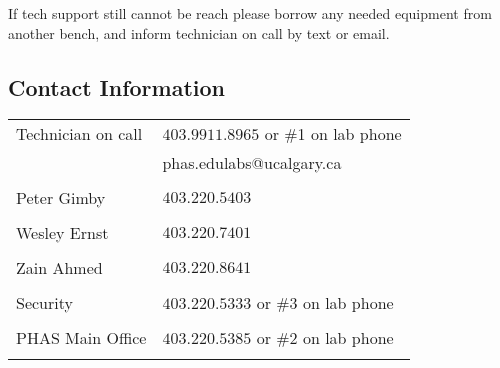\documentclass{../../../assets/LabArx-Dev} 	%
\begin{document}
If tech support still cannot be reach please borrow any needed equipment from another bench, and inform technician on call by text or email.

\subsection*{Contact Information}
\vspace{-.5cm}
\begin{table}[h!]
\centering
\begin{tabular}{>{\raggedright}p{} p{}}

Technician on call  & $403.9911.8965$ or \#1 on lab phone \\ 
& phas.edulabs@ucalgary.ca\\
&\\
Peter Gimby & $403.220.5403$ \\ 
&\\
Wesley Ernst & $403.220.7401$ \\ 
&\\
Zain Ahmed & $403.220.8641$ \\ 
&\\
Security & $403.220.5333$ or \#3 on lab phone\\
&\\
PHAS Main Office &  $403.220.5385$ or \#2 on lab phone\\
&\\
\end{tabular} 
\end{table}
\end{document}
